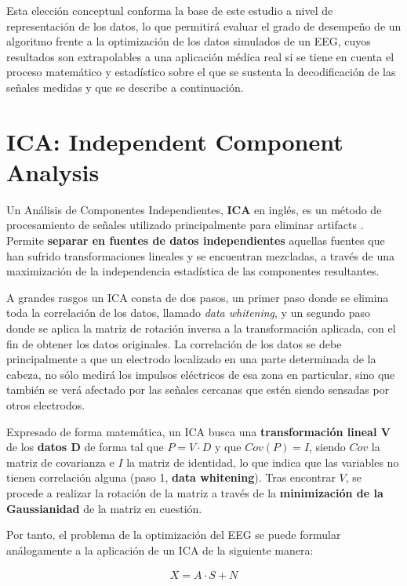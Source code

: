 Esta elección conceptual conforma la base de este estudio a nivel de representación de los datos, lo que permitirá evaluar el grado de desempeño de un algoritmo frente a la optimización de los datos simulados de un EEG, cuyos resultados son extrapolables a una aplicación médica real si se tiene en cuenta el proceso matemático y estadístico sobre el que se sustenta la decodificación de las señales medidas y que se describe a continuación.

\section{ICA: Independent Component Analysis}

Un Análisis de Componentes Independientes, \textbf{ICA} en inglés, es un método de procesamiento de señales utilizado principalmente para eliminar artifacts \cite{ICA-Calibrate}. Permite \textbf{separar en fuentes de datos independientes} aquellas fuentes que han sufrido transformaciones lineales y se encuentran mezcladas, a través de una maximización de la independencia estadística de las componentes resultantes\cite{ICA-EGG}.

A grandes rasgos un ICA consta de dos pasos, un primer paso donde se elimina toda la correlación de los datos, llamado \textit{data whitening}, y un segundo paso donde se aplica la matriz de rotación inversa a la transformación aplicada, con el fin de obtener los datos originales. La correlación de los datos se debe principalmente a que un electrodo localizado en una parte determinada de la cabeza, no sólo medirá los impulsos eléctricos de esa zona en particular, sino que también se verá afectado por las señales cercanas que estén siendo sensadas por otros electrodos. 

 Expresado de forma matemática, un ICA busca una \textbf{transformación lineal V} de los \textbf{datos D} de forma tal que $P = V\cdot D$ y que $Cov(P) = I$, siendo $Cov$ la matriz de covarianza e $I$ la matriz de identidad, lo que indica que las variables no tienen correlación alguna (paso 1, \textbf{data whitening}). Tras encontrar $V$, se procede a realizar la rotación de la matriz a través de la \textbf{minimización de la Gaussianidad} de la matriz en cuestión.
 
 Por tanto, el problema de la optimización del EEG se puede formular análogamente a la aplicación de un ICA de la siguiente manera:
 
 \begin{equation} \label{eq:problem1}
	 \begin{gathered}
		X = A\cdot S + N
	 \end{gathered}
 \end{equation}
 
